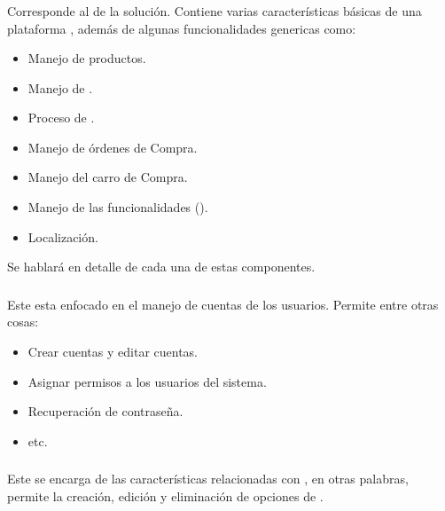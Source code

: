 		\subsubsection{\eframeworkCorePCKG}

			Corresponde al \coreAS de la solución. Contiene varias características básicas de una plataforma \ecommerceCOM, además de  algunas funcionalidades genericas como:

			\begin{itemize}
				\item
					Manejo de productos.
				\item
					Manejo de \sessionsINT. 
				\item
					Proceso de \checkoutCOM.
				\item
					Manejo de órdenes de Compra.
				\item
					Manejo del carro de Compra.	
				\item
					Manejo de las funcionalidades (\dashboardEF).
				\item
					Localización.
			\end{itemize}

			Se hablará en detalle de cada una de estas componentes.

		\subsubsection{\eframeworkAccountsPCKG}

			Este \packagesAS  esta enfocado en el manejo de cuentas de los usuarios. Permite entre otras cosas:

			\begin{itemize}
				\item
					Crear cuentas y editar cuentas.
				\item
					Asignar permisos a los usuarios del sistema.
				\item
					Recuperación de contraseña.
				\item
					etc.
			\end{itemize}

		\subsubsection{\eframeworkShippingPCKG}
			Este \packagesAS se encarga de las características relacionadas con \ShippingCOM, en otras palabras, permite la creación, edición y eliminación de opciones de \ShippingCOM.

